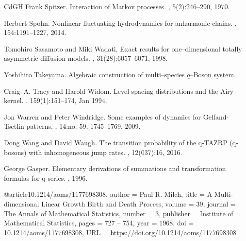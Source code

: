 \begin{thebibliography}{CdGH{\etalchar{+}}}
Frank Spitzer.
\newblock Interaction of {M}arkov processes.
, 5(2):246--290, 1970.

Herbert Spohn.
\newblock Nonlinear fluctuating hydrodynamics for anharmonic chains.
, 154:1191–1227, 2014.

Tomohiro Sasamoto and Miki Wadati.
\newblock Exact results for one--dimensional totally asymmetric diffusion
  models.
, 31(28):6057--6071, 1998.

Yoshihiro Takeyama.
\newblock Algebraic construction of multi--species $q$--{B}oson system.

Craig~A. Tracy and Harold Widom.
\newblock Level-spacing distributions and the {A}iry kernel.
, 159(1):151--174, Jan
  1994.

Jon Warren and Peter Windridge.
\newblock Some examples of dynamics for {G}elfand-{T}setlin patterns.
, 14:no. 59, 1745--1769, 2009.

Dong Wang and David Waugh.
\newblock The transition probability of the q-{TAZRP} (q-bosons) with
  inhomogeneous jump rates.
, 12(037):16, 2016.

George Gasper.
\newblock Elementary derivations of summations and transformation formulas for
  q-series.
, 1996.
\end{thebibliography}




@article{10.1214/aoms/1177698308,
author = {Paul R. Milch},
title = {{A Multi-dimensional Linear Growth Birth and Death Process}},
volume = {39},
journal = {The Annals of Mathematical Statistics},
number = {3},
publisher = {Institute of Mathematical Statistics},
pages = {727 -- 754},
year = {1968},
doi = {10.1214/aoms/1177698308},
URL = {https://doi.org/10.1214/aoms/1177698308}
}



